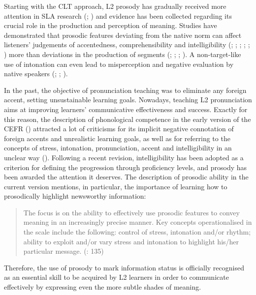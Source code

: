 Starting with the CLT approach, L2 prosody has gradually received more attention in SLA research (\citealt{Busà2008}; \citealt{Lengeris2012}) and evidence has been collected regarding its crucial role in the production and perception of meaning. Studies have demonstrated that prosodic features deviating from the native norm can affect listeners’ judgements of accentedness, comprehensibility and intelligibility (\citealt{Hahn2004}; \citealt{Jilka2000}; \citealt{Kang2010}; \citealt{RubinPickering2010}; \citealt{MunroDerwing2001}; \citealt{TrofimovichBaker2006}) more than deviations in the production of segments (\citealt{MunroWiebe1998}; \citealt{Munro1995}; \citealt{MunroDerwing1999}; \citealt{GordonDarcy2022}). A non-target-like use of intonation can even lead to misperception and negative evaluation by native speakers (\citealt{Munro2003}; \citealt{MunroDerwing2020}; \citealt{LeVelleLevis2014}).

In the past, the objective of pronunciation teaching was to eliminate any foreign accent, setting unsustainable learning goals. Nowadays, teaching L2 pronunciation aims at improving learners’ communicative effectiveness and success. Exactly for this reason, the description of phonological competence in the early version of the CEFR (\citealt{CouncilOfEurope2001}) attracted a lot of criticisms for its implicit negative connotation of foreign accents and unrealistic learning goals, as well as for referring to the concepts of stress, intonation, pronunciation, accent and intelligibility in an unclear way (\citealt{PiccardoNorth2017}). Following a recent revision, intelligibility has been adopted as a criterion for defining the progression through proficiency levels, and prosody has been awarded the attention it deserves. The description of prosodic ability in the current version mentions, in particular, the importance of learning how to prosodically highlight newsworthy information:

\begin{quote}
The focus is on the ability to effectively use prosodic features to convey meaning in an increasingly precise manner. Key concepts operationalised in the scale include the following: control of stress, intonation and/or rhythm; ability to exploit and/or vary stress and intonation to highlight his/her particular message. (\citealt{GoodierNorth2018}: 135)
\end{quote}

Therefore, the use of prosody to mark information status is officially recognised as an essential skill to be acquired by L2 learners in order to communicate effectively by expressing even the more subtle shades of meaning.

